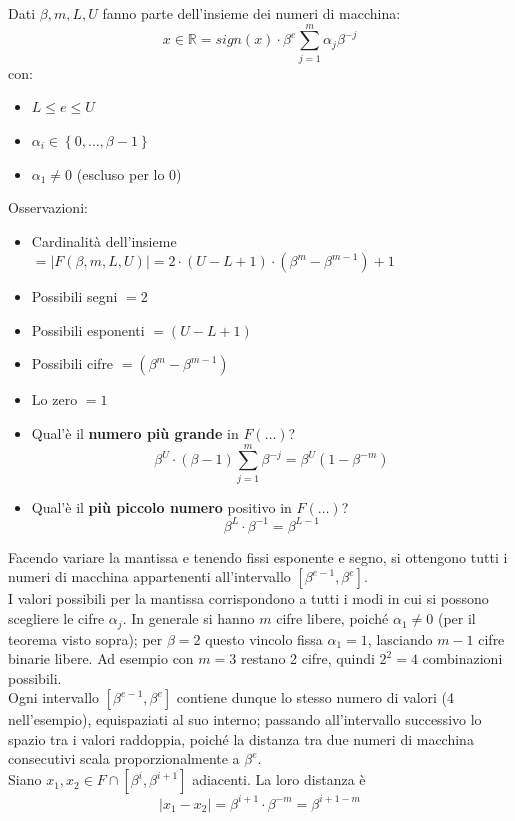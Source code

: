 \documentclass[12pt,a4paper,]{report}
\begin{document}
\begin{definizione}
    Dati $\beta, m, L, U$ fanno parte dell'insieme dei numeri di macchina:
    \[
    x \in \mathbb{R} = sign(x) \cdot \beta^e \sum^m_{j=1} \alpha_j\beta^{-j} 
    \]
    con:
    \begin{itemize}
        \item $L\le e \le U$
        \item $\alpha_i \in\left\{0,\dots,\beta-1\right\}$
        \item $\alpha_1 \ne 0$ (escluso per lo 0)
    \end{itemize}
\end{definizione}
\noindent Osservazioni:
\begin{itemize}
    \item Cardinalità dell'insieme $=|F(\beta, m, L, U)| = 2 \cdot (U - L + 1) \cdot (\beta^m - \beta^{m-1}) + 1$
    \item Possibili segni $= 2$
    \item Possibili esponenti $= (U - L + 1)$
    \item Possibili cifre $= (\beta^m - \beta^{m-1})$
    \item Lo zero $= 1$

  \item Qual'è il \textbf{numero più grande} in $F(\ldots)$?
        \[
        \beta^U \cdot (\beta - 1) \sum_{j=1}^{m} \beta^{-j} = \boxed{\beta^U(1 - \beta^{-m})}
        \]
  
  \item Qual'è il \textbf{più piccolo numero} positivo in $F(\ldots)$?
        \[
        \beta^L \cdot \beta^{-1} = \boxed{\beta^{L-1}}
        \]
\end{itemize}
Facendo variare la mantissa e tenendo fissi esponente e segno, si ottengono tutti i numeri di macchina appartenenti all'intervallo $[\beta^{e-1}, \beta^e]$.
\\
I valori possibili per la mantissa corrispondono a tutti i modi in cui si possono scegliere le cifre $\alpha_j$. In generale si hanno $m$ cifre libere, poiché $\alpha_1 \neq 0$ (per il teorema visto sopra); per $\beta = 2$ questo vincolo fissa $\alpha_1 = 1$, lasciando $m-1$ cifre binarie libere. Ad esempio con $m = 3$ restano 2 cifre, quindi $2^2 = 4$ combinazioni possibili.
\\
Ogni intervallo $[\beta^{e-1}, \beta^e]$ contiene dunque lo stesso numero di valori (4 nell'esempio), equispaziati al suo interno; passando all'intervallo successivo lo spazio tra i valori raddoppia, poiché la distanza tra due numeri di macchina consecutivi scala proporzionalmente a $\beta^e$.
\\
Siano $x_1, x_2 \in F \cap [\beta^i, \beta^{i+1}]$ adiacenti. La loro distanza è
\[
|x_1 - x_2| = \beta^{i+1} \cdot \beta^{-m} = \beta^{i+1-m}
\]
\end{document}
